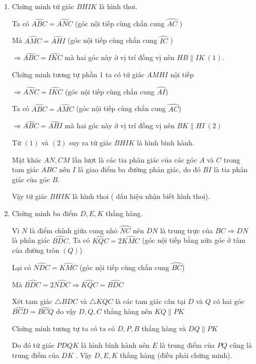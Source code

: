 \begin{bt}
{{\begin{enumerate}
    		$\Rightarrow  \bigtriangleup KBN \sim \bigtriangleup BMN  \Rightarrow \dfrac{KN}{BN}=\dfrac{BN}{MN} \Rightarrow NB^2=NK.NM	$(điều phải chứng minh).
    		
    		\item Chứng minh tứ giác $BHIK$ là hình thoi.
    		
    		Ta có $\widehat{ABC}=\widehat{ANC}$ (góc nội tiếp cùng chắn cung $\wideparen{AC}$ )
    		
    		Mà $\widehat{AMC}=\widehat{AHI}$ (góc nội tiếp cùng chắn cung $\wideparen{IC}$ )
    		
    		$\Rightarrow \widehat{ABC}=\widehat{IKC}	$ mà hai góc này ở vị trí đồng vị nên $HB \parallel IK  \ (1)$.
    		
    		   Chứng minh tương tự phần 1 ta có tứ giác $AMHI$ nội tiếp
    		   
    		   $ \Rightarrow \widehat{ANC}=\widehat{IKC}$ (góc nội tiếp cùng chắn cung $\wideparen{AI}$)
    		   
    		   Ta có  $  \widehat{ABC}=\widehat{AMC}$ (góc nội tiếp cùng chắn cung $\wideparen{AC}$)
    		   
    		  $ \Rightarrow \widehat{ABC}=\widehat{AHI}$ mà hai góc này ở vị trí đồng vị nên $BK \parallel HI  \ (2)$
    		  
    		  Từ $(1)$ và $(2)$  suy ra tứ giác $BHIK$ là hình bình hành.
    		  
    		  Mặt khác $AN, CM$ lần lượt là các tia phân giác của các góc $A$ và $C$ trong tam giác $ABC$
    		  nên $I$ là giao điểm ba đường phån giác, do đó $BI$ là tia phân giác của góc $B$.
    		  
    		  Vậy tứ giác $BHIK$ là hình thoi ( dấu hiệu nhận biết hình thoi). 
    		  
    		  \item Chứng minh
    		  ba điểm $D,E,K$ thẳng hàng.
    		  
    		  Vì $N$ là điểm chính giữa cung nhỏ $\wideparen{NC}$ nên $DN$ là trung trực của $BC \Rightarrow DN$ là phân giác $\widehat{BDC}.$ Ta có $\widehat{KQC}=2\widehat{KMC}$ (góc nội tiếp bằng nữa góc ở tâm  của đường tròn $(Q)$)
    		  
    		  Lại có $\widehat{NDC}=\widehat{KMC}$ (góc nội tiếp cùng chắn cung $\wideparen{BC}$)
    		  
    		  Mà $\widehat{BDC}=2\widehat{NDC} \Rightarrow \widehat{KQC}=\widehat{BDC}$
    		  
    		  Xét tam giác $\bigtriangleup BDC$ và $\bigtriangleup KQC $
 là các tam giác cân tại $D$ và $Q$ có hai góc $\widehat{BCD}=\widehat{BCQ}$ do vậy $D,Q,C$ thẳng hàng nên $KQ \parallel PK$

Chứng minh tương tự ta có ta có $D,P,B$ thẳng hàng và $ DQ\parallel PK$


Do đó tứ giác $PDQK$ là hình bình hành nên $E$ là trung điểm của $PQ$ cũng là trung điểm
của $DK$ . Vậy $D,E,K$ thẳng hàng (điều phải chứng minh).
    	     \end{enumerate}}
         
         
}
\end{bt}



